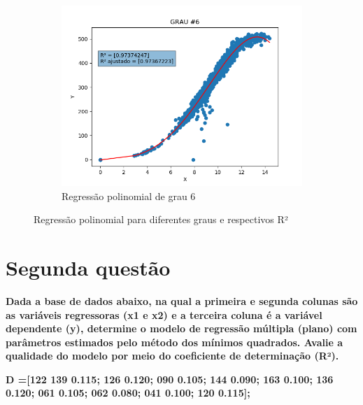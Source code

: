 \documentclass[paper=a4, fontsize=11pt]{scrartcl}
\numberwithin{equation}{section}		%
\numberwithin{figure}{section}			%
\numberwithin{table}{section}				%
\begin{document}
\begin{figure}[h!]
\begin{subfigure}{.5\textwidth}
			\includegraphics[width=\linewidth]{img/q1_fig_GRAU6.png}
			\caption{Regressão polinomial de grau 6}
			\label{fig:q1grau6}
		\end{subfigure}%
		
		\caption{Regressão polinomial para diferentes graus e respectivos R²}
		\label{fig:fig1}
	\end{figure}
	
	
	\section{Segunda questão}
	
	\textbf{Dada a base de dados abaixo, na qual a primeira e segunda colunas são as variáveis regressoras (x1 e x2) e a terceira coluna é a variável dependente (y), determine o modelo de regressão múltipla (plano) com parâmetros estimados pelo método dos mínimos quadrados. Avalie a qualidade do modelo por meio do coeficiente de determinação (R²).}
	\begin{center}
		
		\textbf{D =[122 139 0.115; 126 0.120; 090 0.105; 144 0.090; 163 0.100; 136 0.120; 061 0.105; 062 0.080; 041 0.100; 120 0.115]; \newline}
	\end{center}
	
\end{document}
